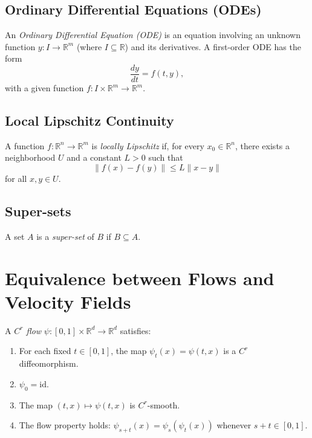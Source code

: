 \documentclass[12pt,a4paper]{article}
\begin{document}
\subsection{Ordinary Differential Equations (ODEs)}

\begin{definition}\label{def:ODE}
An \emph{Ordinary Differential Equation (ODE)} is an equation involving an unknown function \( y: I \to \mathbb{R}^m \) (where \( I \subseteq \mathbb{R} \)) and its derivatives. A first-order ODE has the form
\[
\frac{dy}{dt} = f(t,y),
\]
with a given function \( f: I \times \mathbb{R}^m \to \mathbb{R}^m \).
\end{definition}

\subsection{Local Lipschitz Continuity}

\begin{definition}\label{def:locally_Lipschitz}
A function \( f: \mathbb{R}^n \to \mathbb{R}^m \) is \emph{locally Lipschitz} if, for every \( x_0 \in \mathbb{R}^n \), there exists a neighborhood \( U \) and a constant \( L>0 \) such that
\[
\|f(x)-f(y)\| \le L\|x-y\|
\]
for all \( x,y \in U \).
\end{definition}

\subsection{Super-sets}

\begin{definition}\label{def:superset}
A set \( A \) is a \emph{super-set} of \( B \) if \( B \subseteq A \).
\end{definition}

\section{Equivalence between Flows and Velocity Fields}\label{sec:equivalence}

\begin{definition}[\( C^r \) Flow]\label{def:Cr_flow}
A \emph{\( C^r \) flow} \( \psi: [0,1] \times \mathbb{R}^d \to \mathbb{R}^d \) satisfies:
\begin{enumerate}
    \item For each fixed \( t \in [0,1] \), the map \( \psi_t(x) = \psi(t,x) \) is a \( C^r \) diffeomorphism.
    \item \( \psi_0 = \text{id} \).
    \item The map \( (t,x) \mapsto \psi(t,x) \) is \( C^r \)-smooth.
    \item The flow property holds: \( \psi_{s+t}(x) = \psi_s(\psi_t(x)) \) whenever \( s+t \in [0,1] \).
\end{enumerate}
\end{definition}
\end{document}
